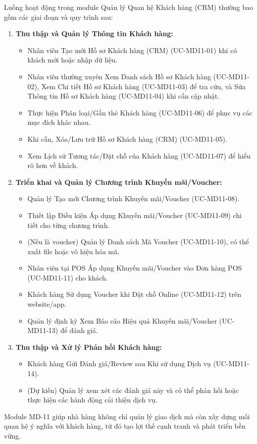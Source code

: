 \label{sssec:md11_overall_workflow}
Luồng hoạt động trong module Quản lý Quan hệ Khách hàng (CRM) thường bao gồm các giai đoạn và quy trình sau:
\begin{enumerate}
    \item \textbf{Thu thập và Quản lý Thông tin Khách hàng:}
        \begin{itemize}
            \item Nhân viên Tạo mới Hồ sơ Khách hàng (CRM) (UC-MD11-01) khi có khách mới hoặc nhập dữ liệu.
            \item Nhân viên thường xuyên Xem Danh sách Hồ sơ Khách hàng (UC-MD11-02), Xem Chi tiết Hồ sơ Khách hàng (UC-MD11-03) để tra cứu, và Sửa Thông tin Hồ sơ Khách hàng (UC-MD11-04) khi cần cập nhật.
            \item Thực hiện Phân loại/Gắn thẻ Khách hàng (UC-MD11-06) để phục vụ các mục đích khác nhau.
            \item Khi cần, Xóa/Lưu trữ Hồ sơ Khách hàng (CRM) (UC-MD11-05).
            \item Xem Lịch sử Tương tác/Đặt chỗ của Khách hàng (UC-MD11-07) để hiểu rõ hơn về khách.
        \end{itemize}
    \item \textbf{Triển khai và Quản lý Chương trình Khuyến mãi/Voucher:}
        \begin{itemize}
            \item Quản lý Tạo mới Chương trình Khuyến mãi/Voucher (UC-MD11-08).
            \item Thiết lập Điều kiện Áp dụng Khuyến mãi/Voucher (UC-MD11-09) chi tiết cho từng chương trình.
            \item (Nếu là voucher) Quản lý Danh sách Mã Voucher (UC-MD11-10), có thể xuất file hoặc vô hiệu hóa mã.
            \item Nhân viên tại POS Áp dụng Khuyến mãi/Voucher vào Đơn hàng POS (UC-MD11-11) cho khách.
            \item Khách hàng Sử dụng Voucher khi Đặt chỗ Online (UC-MD11-12) trên website/app.
            \item Quản lý định kỳ Xem Báo cáo Hiệu quả Khuyến mãi/Voucher (UC-MD11-13) để đánh giá.
        \end{itemize}
    \item \textbf{Thu thập và Xử lý Phản hồi Khách hàng:}
        \begin{itemize}
            \item Khách hàng Gửi Đánh giá/Review sau Khi sử dụng Dịch vụ (UC-MD11-14).
            \item (Dự kiến) Quản lý xem xét các đánh giá này và có thể phản hồi hoặc thực hiện các hành động cải thiện dịch vụ.
        \end{itemize}
\end{enumerate}
Module MD-11 giúp nhà hàng không chỉ quản lý giao dịch mà còn xây dựng mối quan hệ ý nghĩa với khách hàng, từ đó tạo lợi thế cạnh tranh và phát triển bền vững.

